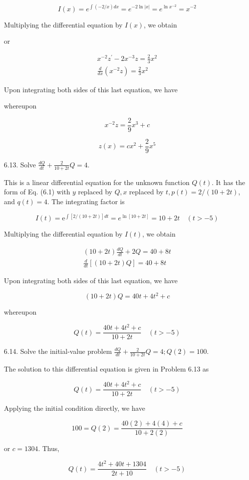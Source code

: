 \documentclass[10pt]{article}
\begin{document}
$$
I(x)=e^{\int(-2 / x) d x}=e^{-2 \ln |x|}=e^{\ln x^{-2}}=x^{-2}
$$

Multiplying the differential equation by $I(x)$, we obtain

or

$$
\begin{gathered}
x^{-2} z^{\prime}-2 x^{-3} z=\frac{2}{3} x^{2} \\
\frac{d}{d x}\left(x^{-2} z\right)=\frac{2}{3} x^{2}
\end{gathered}
$$

Upon integrating both sides of this last equation, we have

whereupon

$$
x^{-2} z=\frac{2}{9} x^{3}+c
$$

$$
z(x)=c x^{2}+\frac{2}{9} x^{5}
$$

6.13. Solve $\frac{d Q}{d t}+\frac{2}{10+2 t} Q=4$.

This is a linear differential equation for the unknown function $Q(t)$. It has the form of Eq. (6.1) with $y$ replaced by $Q, x$ replaced by $t, p(t)=2 /(10+2 t)$, and $q(t)=4$. The integrating factor is

$$
I(t)=\mathrm{e}^{\int[2 /(10+2 t)] d t}=e^{\ln [10+2 t]}=10+2 t \quad(t>-5)
$$

Multiplying the differential equation by $I(t)$, we obtain

$$
\begin{gathered}
(10+2 t) \frac{d Q}{d t}+2 Q=40+8 t \\
\frac{d}{d t}[(10+2 t) Q]=40+8 t
\end{gathered}
$$

Upon integrating both sides of this last equation, we have

$$
(10+2 t) Q=40 t+4 t^{2}+c
$$

whereupon

$$
Q(t)=\frac{40 t+4 t^{2}+c}{10+2 t} \quad(t>-5)
$$

6.14. Solve the initial-value problem $\frac{d Q}{d t}+\frac{2}{10+2 t} Q=4 ; Q(2)=100$.

The solution to this differential equation is given in Problem 6.13 as

$$
Q(t)=\frac{40 t+4 t^{2}+c}{10+2 t} \quad(t>-5)
$$

Applying the initial condition directly, we have

$$
100=Q(2)=\frac{40(2)+4(4)+c}{10+2(2)}
$$

or $c=1304$. Thus,

$$
Q(t)=\frac{4 t^{2}+40 t+1304}{2 t+10} \quad(t>-5)
$$
\end{document}
